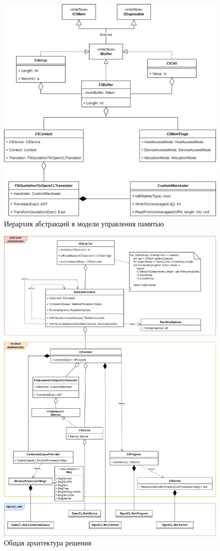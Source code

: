 \begin{figure}
\centering
\includegraphics[scale=0.3]{pictures/Mem (1).png}
\caption{Иерархия абстракций в модели управления памятью}
\label{fig:mem}
\end{figure}

\begin{figure}
\centering
\includegraphics[scale=0.25]{pictures/class.png}
\caption{Общая архитектура решения}
\label{fig:ar}
\end{figure}